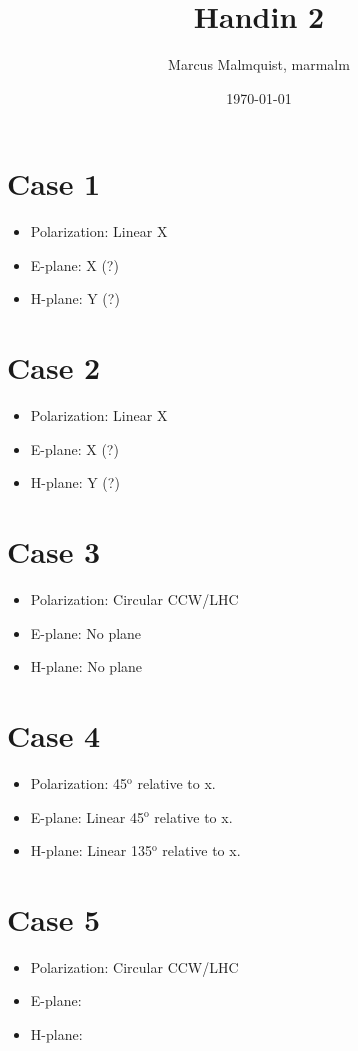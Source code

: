 \documentclass[12pt,a4paper]{article}
\title{Handin 2}
\author{Marcus Malmquist, marmalm}
\date{\today}
\begin{document}
\maketitle

\section{Case 1}\label{sec:1}
\begin{itemize}
\item Polarization: Linear X
\item E-plane: X (?)
\item H-plane: Y (?)
\end{itemize}
\section{Case 2}\label{sec:2}
\begin{itemize}
\item Polarization: Linear X
\item E-plane: X (?)
\item H-plane: Y (?)
\end{itemize}
\section{Case 3}\label{sec:3}
\begin{itemize}
\item Polarization: Circular CCW/LHC
\item E-plane: No plane
\item H-plane: No plane
\end{itemize}
\section{Case 4}\label{sec:4}
\begin{itemize}
\item Polarization: 45$^\text{o}$ relative to x.
\item E-plane: Linear 45$^\text{o}$ relative to x.
\item H-plane: Linear 135$^\text{o}$ relative to x.
\end{itemize}
\section{Case 5}\label{sec:5}
\begin{itemize}
\item Polarization: Circular CCW/LHC
\item E-plane: 
\item H-plane: 
\end{itemize}
\end{document}
